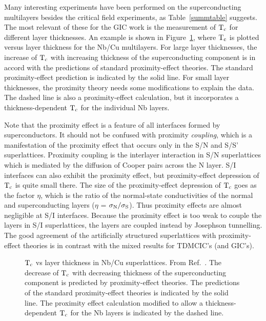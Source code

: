         Many   interesting    experiments   have  been   performed  on  the
superconducting  multilayers  besides the  critical  field  experiments, as
Table~\ref{summtable} suggests.  The  most relevant  of  these for  the GIC
work is the measurement of $\rm T_c$  for  different layer thicknesses.  An
example is shown in Figure~\ref{assltc}, where $\rm T_c$  is plotted versus
layer  thickness for the  Nb/Cu multilayers.  For large layer  thicknesses,
the increase of $\rm T_c$ with increasing  thickness of the superconducting
component is in  accord with the  predictions of  standard proximity-effect
theories.\cite{cooper61,degennes66}   The      standard    proximity-effect
prediction is indicated by  the solid line.   For small layer  thicknesses,
the  proximity theory needs some  modifications to  explain the data.   The
dashed  line is also a proximity-effect  calculation, but it incorporates a
thickness-dependent $\rm T_c$ for the individual Nb layers.\cite{banerjee84}

        Note that the  proximity   effect is  a  feature  of all interfaces
formed by superconductors.  It  should not  be confused with proximity {\em
coupling\/}, which is  a manifestation of the  proximity effect that occurs
only in  the  S/N and  S/S'   superlattices.   Proximity coupling  is   the
interlayer interaction   in  S/N superlattices  which  is   mediated by the
diffusion of  Cooper pairs across  the  N  layer.   S/I interfaces can also
exhibit the proximity effect, but proximity-effect depression  of $\rm T_c$
is quite small there.  The size of the proximity-effect depression  of $\rm
T_c$ goes as the  factor $\eta$,  which  is the ratio of   the normal-state
conductivities of the normal and superconducting layers ($\eta$ = $\rm
\sigma_N   /  \sigma_S$).\cite{ruggiero82,degennes66}   Thus proximity
effects  are almost negligible   at S/I interfaces.   Because the proximity
effect is too weak  to couple the  layers in S/I  superlattices, the layers
are coupled instead   by Josephson  tunnelling.\cite{ruggiero85} The   good
agreement    of   the   artificially     structured    superlattices   with
proximity-effect theories  is  in  contrast   with the mixed results    for
TDMCIC's (and GIC's).

\begin{figure}
\vspace{15cm}
\caption[$\rm T_c$ versus layer thickness in Nb/Cu superlattices]{$\rm T_c$
vs        layer     thickness    in   Nb/Cu      superlattices.     From
Ref.~\cite{banerjee84}.  The decrease of $\rm T_c$ with decreasing
thickness of the superconducting component is predicted by
proximity-effect theories.\cite{cooper61,degennes66}  The predictions of
the standard proximity-effect theories is indicated by the solid line.  The
proximity effect calculation modified to allow a thickness-dependent $\rm
T_c$ for the Nb layers is indicated by the dashed line.}
\label{assltc}
\end{figure}


